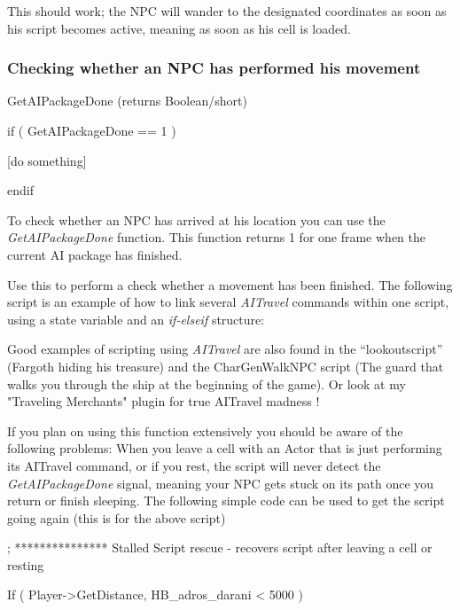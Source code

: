 

This should work; the NPC will wander to the designated coordinates as
soon as his script becomes active, meaning as soon as his cell is
loaded.

\hypertarget{checking-whether-an-npc-has-performed-his-movement}{%
\subsubsection{Checking whether an NPC has performed his
movement}\label{checking-whether-an-npc-has-performed-his-movement}}

GetAIPackageDone (returns Boolean/short)

if ( GetAIPackageDone == 1 )

{[}do something{]}

endif

To check whether an NPC has arrived at his location you can use the
\emph{GetAIPackageDone} function. This function returns 1 for one frame
when the current AI package has finished.

Use this to perform a check whether a movement has been finished. The
following script is an example of how to link several \emph{AITravel}
commands within one script, using a state variable and an
\emph{if-elseif} structure:



Good examples of scripting using \emph{AITravel} are also found in the
``lookoutscript'' (Fargoth hiding his treasure) and the CharGenWalkNPC
script (The guard that walks you through the ship at the beginning of
the game). Or look at my "Traveling Merchants" plugin for true AITravel
madness !

If you plan on using this function extensively you should be aware of
the following problems: When you leave a cell with an Actor that is just
performing its AITravel command, or if you rest, the script will never
detect the \emph{GetAIPackageDone} signal, meaning your NPC gets stuck
on its path once you return or finish sleeping. The following simple
code can be used to get the script going again (this is for the above
script)


; *************** Stalled Script rescue - recovers script after leaving
a cell or resting

If ( Player-\textgreater GetDistance, HB\_adros\_darani \textless{} 5000
)

